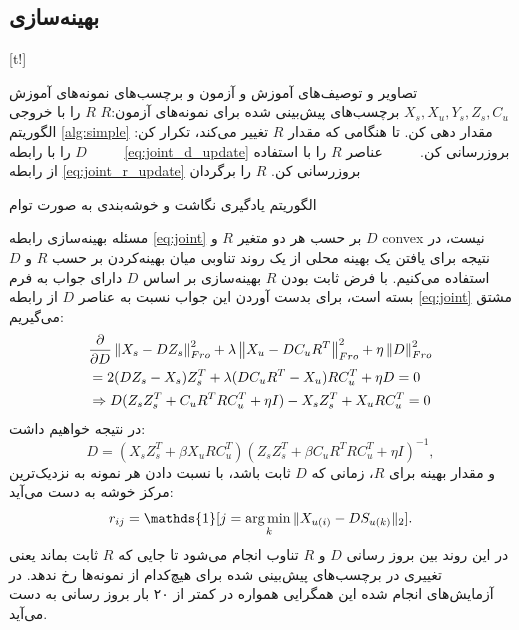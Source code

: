 \subsection{بهینه‌سازی}\label{jeac_opt}

[t!]
	\begin{enumerate}[label={\arabic*},itemsep=.1em, parsep=.1em]
 تصاویر و توصیف‌های آموزش و آزمون و برچسب‌های نمونه‌های آموزش $X_s, X_u, Y_s, Z_s, C_u$
 برچسب‌های پیش‌بینی شده برای نمونه‌های آزمون:$R$
 $R$ را با خروجی الگوریتم \ref{alg:simple} مقدار دهی کن.
 تا هنگامی که مقدار $R$ تغییر می‌کند،  تکرار کن:
 $\qquad$  $D$ را با رابطه \eqref{eq:joint_d_update} بروزرسانی کن.
 $\qquad$ عناصر $R$ را با استفاده از رابطه \eqref{eq:joint_r_update} بروزرسانی کن.
 $R$ را برگردان
\end{enumerate}
\caption{الگوریتم یادگیری نگاشت و خوشه‌بندی به صورت توام}
\label{alg:jeac}

مسئله بهینه‌سازی رابطه \eqref{eq:joint} بر حسب هر دو متغیر $R$ و $D$
\gls{convex}  نیست، در نتیجه برای یافتن یک بهینه محلی از یک روند تناوبی میان بهینه‌کردن بر حسب $R$ و $D$ استفاده می‌کنیم.
با فرض ثابت بودن $R$ بهینه‌سازی بر اساس $D$ دارای جواب به فرم بسته است، برای بدست آوردن این جواب نسبت به عناصر $D$ از رابطه \eqref{eq:joint} مشتق می‌گیریم:
\begin{align*}
& \frac{\partial}{\partial D}\left \lVert X_s - D Z_s \right \rVert_{Fro}^2  + \lambda \left \lVert X_u - D C_u R^T  \right \rVert_{Fro}^2 + \eta \left \lVert D \right \rVert_{Fro}^2 \\
& =2 (DZ_s - X_s)Z_s^T + \lambda (DC_uR^T - X_u) RC_u^T + \eta D = 0 \\
& \Rightarrow D(Z_sZ_s^T + C_uR^TRC_u^T + \eta I) - X_sZ_s^T + X_uRC_u^T  = 0
\end{align*}
در نتیجه خواهیم داشت:
\begin{equation} \label{eq:joint_d_update}
  D = (X_s Z_s^T + \beta X_u R C_u^T) (Z_s Z_s^T + \beta C_u R^T R C_u^T  + \eta I)^{-1},
\end{equation}
و مقدار بهینه برای $R$، زمانی که $D$ ثابت باشد، با نسبت دادن هر نمونه به نزدیک‌ترین مرکز خوشه به دست می‌آید:
\begin{equation} \label{eq:joint_r_update}
  r_{ij} = \mathds{1}[j = \argmin_{k} \lVert X_{u(i)} - D S_{u(k)} \rVert_2 ].
\end{equation}
در این روند بین بروز رسانی $D$ و $R$ تناوب انجام می‌شود تا جایی که $R$ ثابت بماند یعنی تغییری در برچسب‌های پیش‌بینی شده برای هیچ‌کدام از نمونه‌ها رخ ندهد. در آزمایش‌های انجام شده این همگرایی همواره در کمتر از ۲۰ بار بروز رسانی به دست می‌آید.

